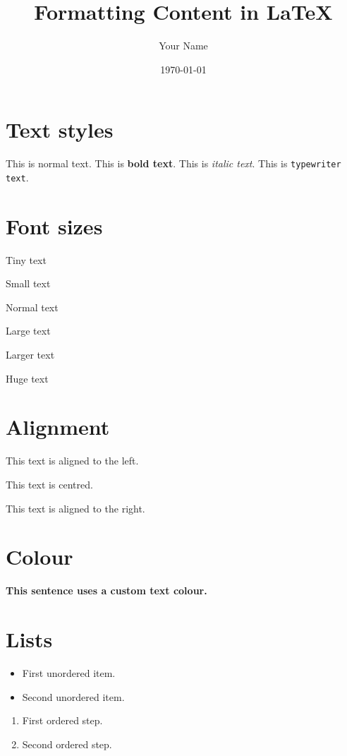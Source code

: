 \documentclass[12pt,a4paper]{article}
\title{Formatting Content in LaTeX}
\author{Your Name}
\date{\today}
\begin{document}
\maketitle

\section{Text styles}
This is normal text. This is \textbf{bold text}. This is \textit{italic text}. This is \texttt{typewriter text}.

\section{Font sizes}
{\tiny Tiny text}\par
{\small Small text}\par
{\normalsize Normal text}\par
{\large Large text}\par
{\Large Larger text}\par
{\huge Huge text}

\section{Alignment}
\begin{flushleft}This text is aligned to the left.\end{flushleft}
\begin{center}This text is centred.\end{center}
\begin{flushright}This text is aligned to the right.\end{flushright}

\section{Colour}
{\color{CourseBlue}\textbf{This sentence uses a custom text colour.}}

\section{Lists}
\begin{itemize}
  \item First unordered item.
  \item Second unordered item.
\end{itemize}

\begin{enumerate}
  \item First ordered step.
  \item Second ordered step.
\end{enumerate}
\end{document}
